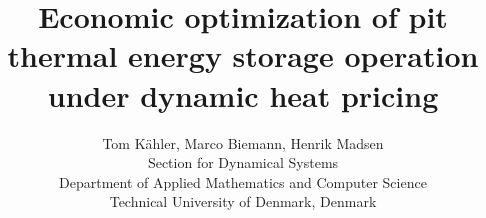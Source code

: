 \title{Economic optimization of pit thermal energy storage operation
under dynamic heat pricing}
\author{Tom K\"ahler, Marco Biemann, Henrik Madsen\\[0.4em]
\small Section for Dynamical Systems\\
\small Department of Applied Mathematics and Computer Science\\
\small Technical University of Denmark, Denmark}
\date{}

